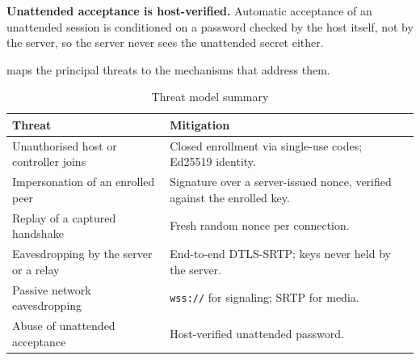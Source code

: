 \textbf{Unattended acceptance is host-verified.} Automatic acceptance of an
unattended session is conditioned on a password checked by the host itself, not
by the server, so the server never sees the unattended secret either.

 maps the principal threats to the mechanisms that address
them.

\begin{table}[H]
\centering
\caption{Threat model summary}
\label{tab:threats}
\small
\begin{tabular}{@{}p{5.4cm}p{8cm}@{}}
\toprule
\textbf{Threat} & \textbf{Mitigation} \\
\midrule
Unauthorised host or controller joins & Closed enrollment via single-use codes; Ed25519 identity. \\
Impersonation of an enrolled peer & Signature over a server-issued nonce, verified against the enrolled key. \\
Replay of a captured handshake & Fresh random nonce per connection. \\
Eavesdropping by the server or a relay & End-to-end DTLS-SRTP; keys never held by the server. \\
Passive network eavesdropping & \texttt{wss://} for signaling; SRTP for media. \\
Abuse of unattended acceptance & Host-verified unattended password. \\
\bottomrule
\end{tabular}
\end{table}
